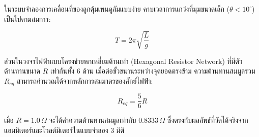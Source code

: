 ในระบบจำลองการเคลื่อนที่ของลูกตุ้มเพนดูลัมแบบง่าย คาบเวลาการแกว่งที่มุมขนาดเล็ก ($\theta < 10^\circ$) เป็นไปตามสมการ:

\begin{equation}
T = 2\pi \sqrt{\frac{L}{g}}
\end{equation}

ส่วนในวงจรไฟฟ้าแบบโครงข่ายหกเหลี่ยมด้านเท่า (Hexagonal Resistor Network) ที่มีตัวต้านทานขนาด $R$ เท่ากันทั้ง 6 ด้าน เมื่อต่อขั้วขนานระหว่างจุดยอดตรงข้าม ความต้านทานสมมูลรวม $R_{eq}$ สามารถคำนวณได้จากหลักการสมมาตรของศักย์ไฟฟ้า:

\begin{equation}
R_{eq} = \frac{5}{6}R
\end{equation}

เมื่อ $R = 1.0\,\Omega$ จะได้ค่าความต้านทานสมมูลเท่ากับ $0.8333\,\Omega$ ซึ่งตรงกับผลลัพธ์ที่วัดได้จริงจากแอมมิเตอร์และโวลต์มิเตอร์ในแบบจำลอง 3 มิติ
